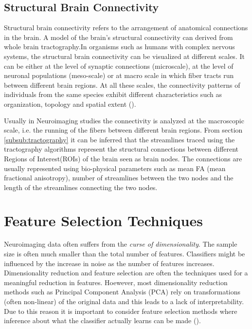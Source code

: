 \documentclass[msthesis.tex]{subfiles}
\begin{document}
\subsection{Structural Brain Connectivity}
Structural brain connectivity refers to the arrangement of anatomical connections in the brain. A model of the brain's structural connectivity can derived from whole brain tractography.In organisms such as humans with complex nervous systems, the structural brain connectivity can be visualized at different scales. It can be either at the level of synaptic connections (microscale), at the level of neuronal populations (meso-scale) or at macro scale in which fiber tracts run between different brain regions. At all these scales, the connectivity patterns of individuals from the same species exhibit different characteristics such as organization, topology and spatial extent (\cite{Sporns:2007}).

Usually in Neuroimaging studies the connectivity is analyzed at the macroscopic scale, i.e. the running of the fibers between different brain regions.  From section \ref{subsub:tractography} it can be inferred that the streamlines traced using the tractography algorithms represent the structural connections between different Regions of Interest(ROIs) of the brain seen as brain nodes. The connections are usually represented using bio-physical parameters such as mean FA (mean fractional anisotropy), number of streamlines between the two nodes and the length of the streamlines connecting the two nodes.


\section{Feature Selection Techniques}
\label{sec:feature_selection}
Neuroimaging data often suffers from the \textit{curse of dimensionality}. The sample size is often much smaller than the total number of features. Classifiers might be influenced by the increase in noise as the number of features increases. Dimensionality reduction and feature selection are often the techniques used for a meaningful reduction in features. Hoewever, most dimensionality reduction methods such as Principal Component Analysis (PCA) rely on transformations (often non-linear) of the original data and this leads to a lack of interpretability. Due to this reason it is important to consider feature selection methods where inference about what the classifier actually learns can be made (\cite{shi2018feature}). 
\end{document}
